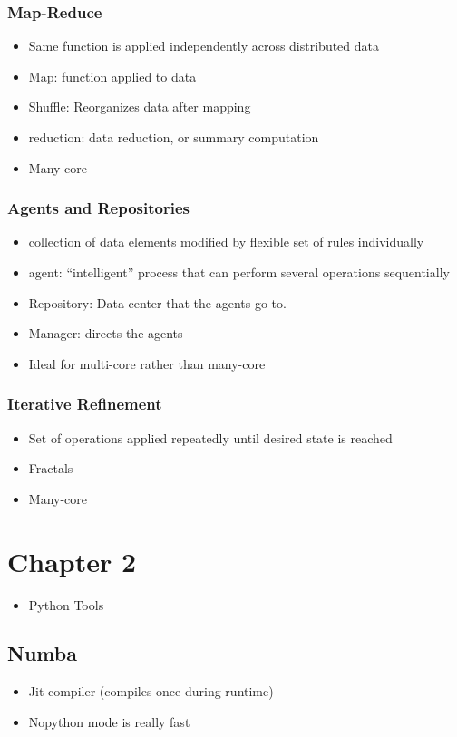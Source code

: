 \documentclass{assignments}
\begin{document}
\subsubsection*{Map-Reduce}
\label{sec:org84135b1}
\begin{itemize}
\item Same function is applied independently across distributed data
\item Map: function applied to data
\item Shuffle: Reorganizes data after mapping
\item reduction: data reduction, or summary computation
\item Many-core
\end{itemize}
\subsubsection*{Agents and Repositories}
\label{sec:orga07dab8}
\begin{itemize}
\item collection of data elements modified by flexible set of rules individually
\item agent: ``intelligent'' process that can perform several operations sequentially
\item Repository: Data center that the agents go to.
\item Manager: directs the agents
\item Ideal for multi-core rather than many-core
\end{itemize}
\subsubsection*{Iterative Refinement}
\label{sec:org31b0309}
\begin{itemize}
\item Set of operations applied repeatedly until desired state is reached
\item Fractals
\item Many-core
\end{itemize}
\section*{Chapter 2}
\label{sec:org71fb5e2}
\begin{itemize}
\item Python Tools
\end{itemize}
\subsection*{Numba}
\label{sec:orgb216a34}
\begin{itemize}
\item Jit compiler (compiles once during runtime)
\item Nopython mode is really fast
\end{itemize}
\end{document}
